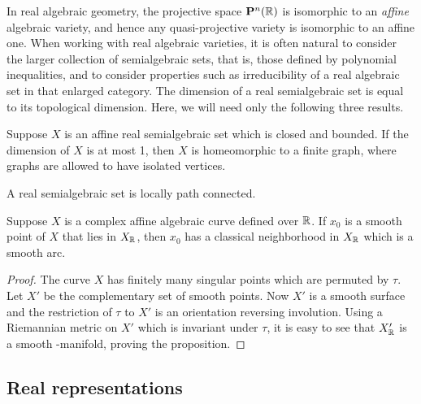 \documentclass[tikz, sepfignums, defaultenums]{nmd/article}
\newcommand{\projsp}{\P}
\begin{document}
In real algebraic geometry, the projective space
$\projsp^n(\R)$ is isomorphic to an \emph{affine} algebraic
variety, and hence any quasi-projective variety is isomorphic to an
affine one.  When working with real algebraic varieties, it is often
natural to consider the larger collection of semialgebraic sets, that
is, those defined by polynomial inequalities, and to consider
properties such as irreducibility of a real algebraic set in that enlarged category.
The dimension of a real semialgebraic set is equal to its topological
dimension. Here, we will need only the following three results.  

\begin{proposition}
  \label{prop:real1}
  Suppose $X$ is an affine real semialgebraic set which is closed and
  bounded.  If the dimension of $X$ is at most 1, then $X$ is
  homeomorphic to a finite graph, where graphs are allowed to have
  isolated vertices.
\end{proposition}

\begin{proposition}
  \label{prop:real3}
  A real semialgebraic set is locally path connected.  
\end{proposition}

\begin{proposition}\label{prop:real2}
  Suppose $X$ is a complex affine algebraic curve defined over ${\mathbb R}$.  If
  $x_0$ is a smooth point of $X$ that lies in $X_{\mathbb R}$, then $x_0$ has a
  classical neighborhood in $X_{\mathbb R}$ which is a smooth arc.
\end{proposition}

\begin{proof}
The curve $X$ has finitely many singular points which are permuted by
$\tau$. Let $X'$ be the complementary set of smooth points.  Now
$X'$ is a smooth surface and the restriction of $\tau$ to $X'$ is an
orientation reversing involution.  Using a Riemannian metric on $X'$
which is invariant under $\tau$, it is easy to see that $X'_{\mathbb R}$ is a
smooth \1-manifold, proving the proposition.
 \end{proof}

\subsection{Real representations}
\end{document}
